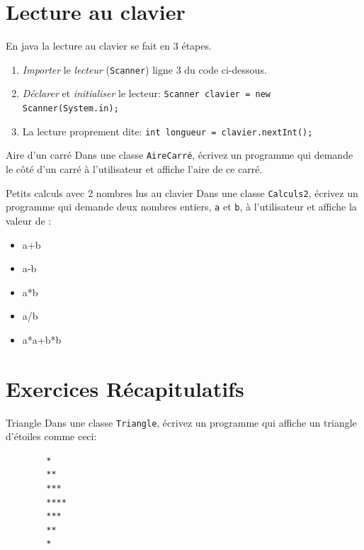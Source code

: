 \documentclass[a4paper,11pt]{article}
\begin{document}
\section{Lecture au clavier}


	En java la lecture au clavier se fait en 3 étapes.

	\begin{enumerate}
		\item \emph{Importer} le \emph{lecteur} (\texttt{Scanner}) ligne 3 du code ci-dessous.
		\item \emph{Déclarer} et \emph{initialiser} le lecteur:  \texttt{Scanner clavier = new Scanner(System.in);}
		\item La lecture proprement dite: \texttt{int longueur = clavier.nextInt();}
	\end{enumerate}



	\begin{Exercice}{Aire d'un carré}
		Dans une classe \texttt{AireCarré}, écrivez un programme qui demande 
		le côté d'un carré à l'utilisateur et affiche l'aire de ce carré.
	\end{Exercice}

	\begin{Exercice}{Petits calculs avec 2 nombres lus au clavier} 
		Dans une classe \texttt{Calculs2}, écrivez un programme qui demande 
		deux nombres entiers, \texttt{a} et \texttt{b}, à l'utilisateur et affiche la valeur de :
		\begin{itemize}
		 	\item a+b
			\item a-b
			\item a*b
			\item a/b
			\item a*a+b*b
		\end{itemize} 
	\end{Exercice}


\section{Exercices Récapitulatifs}

	\begin{Exercice}{Triangle}
		Dans une classe \texttt{Triangle}, écrivez un programme qui affiche un triangle d'étoiles comme ceci:

		\begin{verbatim}
		*
		**
		***
		****
		***
		**
		*
		\end{verbatim}
	\end{Exercice}
		
\end{document}
